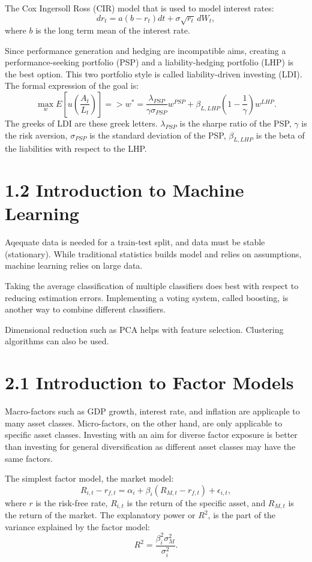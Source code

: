 \documentclass{article}
\begin{document}
The Cox Ingersoll Ross (CIR) model that is used to model interest rates:
\[
dr_t = a(b-r_t)dt + \sigma \sqrt{r_t} \, dW_t,
\]
where $b$ is the long term mean of the interest rate. 

Since performance generation and hedging are incompatible aims,
creating a performance-seeking portfolio (PSP) and
a liability-hedging portfolio (LHP) is the best option.
This two portfolio style is called liability-driven investing (LDI).
The formal expression of the goal is:
\[
\max_w E \left[u\left(\frac{A_t}{L_t}\right)\right]
=> w^* = \frac{\lambda_{PSP}}{\gamma \sigma_{PSP}}w^{PSP}
+ \beta_{L,LHP} \left(1-\frac{1}{\gamma}\right)
w^{LHP}.
\]
The greeks of LDI are these greek letters. $\lambda_{PSP}$ 
is the sharpe ratio of the PSP, $\gamma$ is the risk aversion,
$\sigma_{PSP}$ is the standard deviation of the PSP,
$\beta_{L,LHP}$ is the beta of the liabilities with respect to the LHP.

\section*{1.2 Introduction to Machine Learning}

Aqequate data is needed for a train-test split, and
data must be stable (stationary). 
While traditional statistics builds model and relies
on assumptions, machine learning relies on large data. 

Taking the average classification of multiple classifiers
does best with respect to reducing estimation errors.
Implementing a voting system, called boosting, is another way
to combine different classifiers. 

Dimensional reduction such as PCA helps with feature selection.
Clustering algorithms can also be used. 

\section*{2.1 Introduction to Factor Models}

Macro-factors such as GDP growth, interest rate, and inflation
are applicaple to many asset classes. Micro-factors, on the 
other hand, are only applicable to specific asset classes. 
Investing with an aim for diverse factor exposure is better than
investing for general diversification as different asset classes
may have the same factors. 

The simplest factor model, the market model:
\[
R_{i,t} - r_{f,t} = \alpha_i + \beta_i(R_{M,t} - r_{f,t}) + \epsilon_{i,t},
\]
where  $r$ is the risk-free rate, $R_{i, t}$ is the return of the specific asset,
and $R_{M,t}$ is the return of the market. The explanatory 
power or $R^2$, is the part of the variance explained by the 
factor model: 
\[
R^2 = \frac{\beta_i^2 \sigma_M^2}{\sigma_i^2}.
\]
\end{document}

